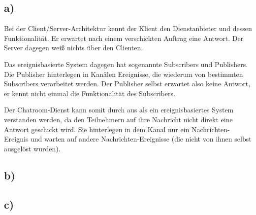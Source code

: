 \subsection*{a)}
Bei der Client/Server-Architektur kennt der Klient den Dienstanbieter und dessen Funktionalität.
Er erwartet nach einem verschickten Auftrag eine Antwort. 
Der Server dagegen weiß nichts über den Clienten.

Das ereignisbasierte System dagegen hat sogenannte Subscribers und Publishers.
Die Publisher hinterlegen in Kanälen Ereignisse, die wiederum von bestimmten Subscribers verarbeitet werden. 
Der Publisher selbst erwartet also keine Antwort, er kennt nicht einmal die Funktionalität des Subscribers.

Der Chatroom-Dienst kann somit durch aus als ein ereignisbasiertes System verstanden werden, da den Teilnehmern auf ihre Nachricht nicht direkt eine Antwort geschickt wird. Sie hinterlegen in dem Kanal nur ein Nachrichten-Ereignis und warten auf andere Nachrichten-Ereignisse (die nicht von ihnen selbst ausgelöst wurden).

\subsection*{b)}


\subsection*{c)}
